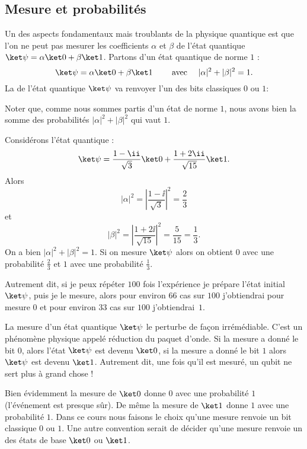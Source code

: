\documentclass[11pt,class=report,crop=false]{standalone}
\begin{document}
\subsection{Mesure et probabilités}

Un des aspects fondamentaux mais troublants de la physique quantique est que l'on ne peut pas mesurer les coefficients $\alpha$ et $\beta$ de l'état quantique $\ket \psi = \alpha \ket0+\beta\ket1$.
Partons d'un état quantique de norme $1$ :
$$\ket \psi = \alpha \ket0+\beta\ket1 \qquad \text{ avec } \quad |\alpha|^2 + |\beta|^2 = 1.$$
La  de l'état quantique $\ket\psi$ va renvoyer l'un des bits classiques $0$ ou $1$:

Noter que, comme nous sommes partis d'un état de norme $1$, nous avons bien 
la somme des probabilités $|\alpha|^2+|\beta|^2$ qui vaut $1$.


\begin{exemple}
Considérons l'état quantique :
$$\ket \psi = \frac{1-\ii}{\sqrt3} \ket 0 + \frac{1+2\ii}{\sqrt{15}}\ket 1.$$
Alors 
$$|\alpha|^2 = \left|\frac{1-\ii}{\sqrt3} \right|^2 = \frac{2}{3}$$
et 
$$|\beta|^2 = \left|\frac{1+2\ii}{\sqrt{15}} \right|^2 = \frac{5}{15} = \frac13.$$
On a bien $|\alpha|^2 + |\beta|^2 = 1$.
Si on mesure $\ket \psi$ alors on obtient $0$ avec une probabilité $\frac23$ et $1$ avec une probabilité $\frac13$.

Autrement dit, si je peux répéter $100$ fois l'expérience \og{}je prépare l'état initial $\ket \psi$, puis je le mesure\fg{}, alors pour environ $66$ cas sur $100$ j'obtiendrai pour mesure $0$ et pour environ  $33$ cas sur $100$ j'obtiendrai~$1$.
\end{exemple}

La mesure d'un état quantique $\ket \psi$ le perturbe de façon irrémédiable. C'est un phénomène physique appelé \og{}réduction du paquet d'onde\fg{}. Si la mesure a donné le bit $0$, alors l'état $\ket \psi$ est devenu $\ket 0$, si la mesure a donné le bit $1$ alors $\ket \psi$ est devenu $\ket 1$. Autrement dit, une fois qu'il est mesuré, un qubit ne sert plus à grand chose !


\begin{remarque*}
Bien évidemment la mesure de $\ket 0$ donne $0$ avec une probabilité $1$ (l'événement est presque sûr). De même la mesure de $\ket 1$ donne $1$ avec une probabilité $1$.
Dans ce cours nous faisons le choix qu'une mesure renvoie un bit classique $0$ ou $1$. Une autre convention serait de décider qu'une mesure renvoie un des états de base $\ket0$ ou $\ket1$.
\end{remarque*}
\end{document}

